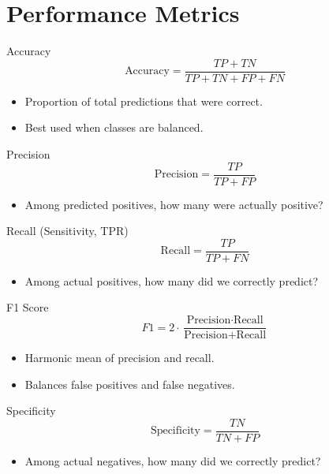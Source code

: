 \documentclass[aspectratio=169]{beamer}
\begin{document}
\section{Performance Metrics}
\label{sec:orge876c59}
\begin{frame}[label={sec:org62489d8}]{Accuracy}
\[
\text{Accuracy} = \frac{TP + TN}{TP + TN + FP + FN}
\]
\begin{itemize}
\item Proportion of total predictions that were correct.
\item Best used when classes are balanced.
\end{itemize}
\end{frame}

\begin{frame}[label={sec:org23cdd64}]{Precision}
\[
\text{Precision} = \frac{TP}{TP + FP}
\]
\begin{itemize}
\item Among predicted positives, how many were actually positive?
\end{itemize}
\end{frame}

\begin{frame}[label={sec:org426437c}]{Recall (Sensitivity, TPR)}
\[
\text{Recall} = \frac{TP}{TP + FN}
\]
\begin{itemize}
\item Among actual positives, how many did we correctly predict?
\end{itemize}
\end{frame}

\begin{frame}[label={sec:org13cb68e}]{F1 Score}
\[
F1 = 2 \cdot \frac{\text{Precision} \cdot \text{Recall}}{\text{Precision} + \text{Recall}}
\]
\begin{itemize}
\item Harmonic mean of precision and recall.
\item Balances false positives and false negatives.
\end{itemize}
\end{frame}

\begin{frame}[label={sec:org163d67c}]{Specificity}
\[
\text{Specificity} = \frac{TN}{TN + FP}
\]
\begin{itemize}
\item Among actual negatives, how many did we correctly predict?
\end{itemize}
\end{frame}
\end{document}
